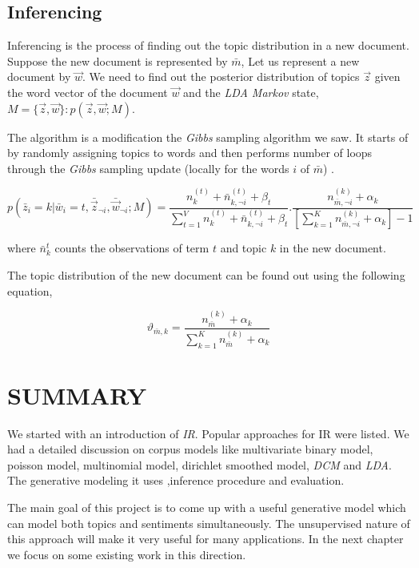 \subsection{Inferencing}

Inferencing is the process of finding out the topic distribution in a new document. Suppose the new document is represented by \(\bar{m}\),
Let us represent a new document by \(\vec{w}\). We need to find out the posterior distribution of topics \(\vec{z}\) given the word 
vector of the document \(\vec{w}\) and the \textit{LDA Markov} state, \(M = \{ \vec{z},\vec{w} \} \colon p(\vec{z},\vec{w};M) \).

The algorithm is a modification the \textit{Gibbs} sampling algorithm we saw. It starts of by randomly assigning topics to words and then
performs number of loops through the \textit{Gibbs} sampling update (locally for the words \(i\) of \(\bar{m}\)) \citep*{heinrich2005parameter}.

\begin{equation}\label{eqn:inferencereqn}
p(\bar{z}_i=k | \bar{w}_i=t,\bar{\vec{z}}_{\neg i},\bar{\vec{w}}_{\neg i};M) =
\frac{n_{k}^{(t)} + \bar{n}_{k,\neg i}^{(t)} + \beta_t}{\sum_{t=1}^{V} n_{k}^{(t)} + \bar{n}_{k,\neg i}^{(t)} + \beta_t}.
\frac{n_{\bar{m},\neg i}^{(k)} + \alpha_k}{[\sum_{k=1}^{K} n_{\bar{m},\neg i}^{(k)} + \alpha_k]-1}
\end{equation}

where \(\bar{n}_{k}^{t}\) counts the observations of term \(t\) and topic \(k\) in the new document.

The topic distribution of the new document can be found out using the following equation,

\begin{equation}
\vartheta_{\bar{m},k} = \frac{n_{\bar{m}}^{(k)} + \alpha_k}{\sum_{k=1}^{K} n_{\bar{m}}^{(k)} + \alpha_k} 
\end{equation}

\section*{SUMMARY}

We started with an introduction of \textit{IR}. Popular approaches for IR were listed. We had a detailed discussion on corpus models like
multivariate binary model, poisson model, multinomial model, dirichlet smoothed model, \textit{DCM} and \textit{LDA}. The generative modeling it uses
,inference procedure and evaluation. 

The main goal of this project is to come up with a useful generative model which can model both topics and sentiments simultaneously.
The unsupervised nature of this approach will make it very useful for many applications. In the next chapter we focus on some existing 
work in this direction.

\clearpage
